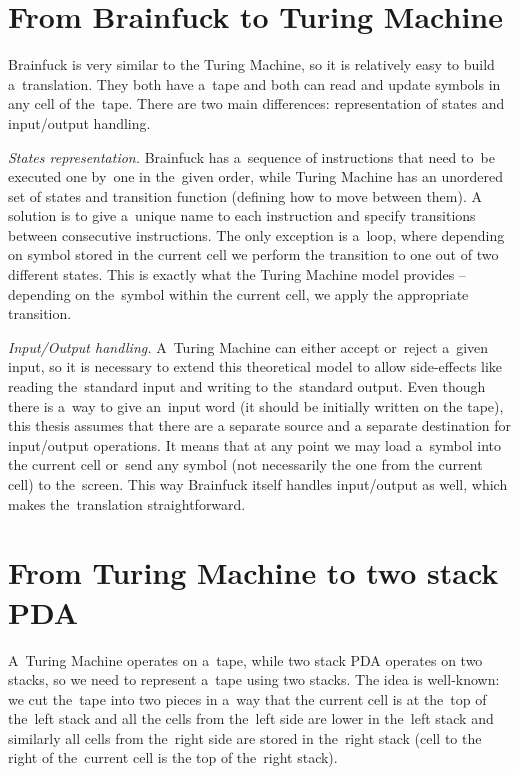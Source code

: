 \documentclass[english,shortabstract,mgr]{iithesis}
\begin{document}
\section {From Brainfuck to Turing Machine}

Brainfuck is very similar to the Turing Machine, so it is relatively easy to build
a~translation. They both have a~tape and both can read and update symbols in any
cell of the~tape. There are two main differences: representation of states and
input/output handling.

\textit{States representation.}
Brainfuck has a~sequence of instructions that need to~be
executed one by~one in the~given order, while Turing Machine has an unordered set
of states and transition function (defining how to move between them). A solution
is to give a~unique name to each instruction and specify transitions between
consecutive instructions. The only exception is a~loop, where depending on
symbol stored in the current cell we perform the transition to one out of two different states.
This is exactly what the Turing Machine model provides -- depending on the~symbol
within the current cell, we apply the appropriate transition.

\textit{Input/Output handling.}
A~Turing Machine can either accept or~reject a~given input, so it is necessary to
extend this theoretical model to allow side-effects like reading the~standard
input and writing to the~standard output. Even though there is a~way to give
an~input word (it should be initially written on the tape), this thesis assumes
that there are a separate source and a separate destination for input/output operations.
It means that at any point we may load a~symbol into the current cell or~send
any symbol (not necessarily the one from the current cell) to the~screen. This
way Brainfuck itself handles input/output as well, which makes the~translation straightforward.

\section {From Turing Machine to two stack PDA}

A~Turing Machine operates on a~tape, while two stack PDA operates on two stacks, so we need
to represent a~tape using two stacks. The idea is well-known: we cut the~tape into
two pieces in a~way that the current cell is at the~top of the~left stack and all
the cells from the~left side are lower in the~left stack and similarly all cells from the~right side
are stored in the~right stack (cell to the right of the~current cell is the top of the~right stack).
\end{document}
